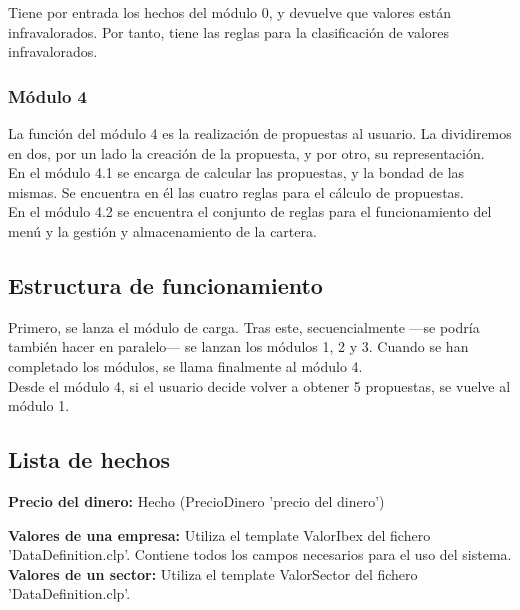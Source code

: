 Tiene por entrada los hechos del módulo 0, y devuelve que valores están infravalorados. Por tanto, tiene las reglas para la clasificación de valores infravalorados.\\

\subsubsection{Módulo 4}

La función del módulo 4 es la realización de propuestas al usuario. La dividiremos en dos, por un lado la creación de la propuesta, y por otro, su representación.\\

En el módulo 4.1 se encarga de calcular las propuestas, y la bondad de las mismas. Se encuentra en él las cuatro reglas para el cálculo de propuestas.\\

En el módulo 4.2 se encuentra el conjunto de reglas para el funcionamiento del menú y la gestión y almacenamiento de la cartera.\\

\subsection{Estructura de funcionamiento}

Primero, se lanza el módulo de carga. Tras este, secuencialmente ---se podría también hacer en paralelo--- se lanzan los módulos 1, 2 y 3. Cuando se han completado los módulos, se llama finalmente al módulo 4.\\

Desde el módulo 4, si el usuario decide volver a obtener 5 propuestas, se vuelve al módulo 1.\\

\subsection{Lista de hechos}

\textbf{Precio del dinero:} Hecho (PrecioDinero 'precio del dinero')

\textbf{Valores de una empresa:} Utiliza el template ValorIbex del fichero 'DataDefinition.clp'. Contiene todos los campos necesarios para el uso del sistema.\\

\textbf{Valores de un sector:} Utiliza el template ValorSector del fichero 'DataDefinition.clp'.\\

